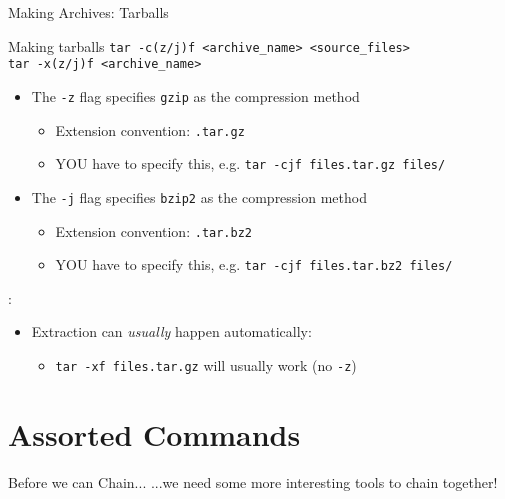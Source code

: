 \begin{frame}[fragile]{Making Archives: Tarballs}
  \begin{block}{Making tarballs}
    \texttt{tar -c(z/j)f <archive\_name> <source\_files>}\\
    \texttt{tar -x(z/j)f <archive\_name>}
    \begin{itemize}
      \item The \texttt{-z} flag specifies \texttt{gzip} as the compression method
      \begin{itemize}
        \item Extension convention: \texttt{.tar.gz}
        \item YOU have to specify this, e.g. \texttt{tar -cjf files.tar.gz files/}
      \end{itemize}
      \item The \texttt{-j} flag specifies \texttt{bzip2} as the compression method
      \begin{itemize}
        \item Extension convention: \texttt{.tar.bz2}
        \item YOU have to specify this, e.g. \texttt{tar -cjf files.tar.bz2 files/}
      \end{itemize}
    \end{itemize}
  \end{block}
  :
  \begin{itemize}
    \item Extraction can \emph{usually} happen automatically:
    \begin{itemize}
      \item \texttt{tar -xf files.tar.gz} will usually work (no \texttt{-z})
    \end{itemize}
  \end{itemize}
\end{frame}

%

%
\section{Assorted Commands}
\label{sec:assorted_commands}

\begin{frame}[fragile]{Before we can Chain...}
  ...we need some more interesting tools to chain together!
\end{frame}

